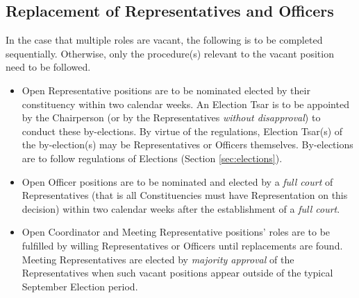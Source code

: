 \documentclass[8pt]{article}
\begin{document}
	\subsection{Replacement of Representatives and Officers}
	In the case that multiple roles are vacant, the following is to be completed sequentially. Otherwise, only the procedure(s) relevant to the vacant position need to be followed. 
	\begin{itemize}
		\item Open Representative positions are to be nominated elected by their constituency within two calendar weeks. An Election Tsar is to be appointed by the Chairperson (or by the Representatives \textit{without disapproval}) to conduct these by-elections. By virtue of the regulations, Election Tsar(s) of the by-election(s) may be Representatives or Officers themselves. By-elections are to follow regulations of Elections (Section \ref{sec:elections}).
		\item Open Officer positions are to be nominated and elected by a \textit{full court} of Representatives (that is all Constituencies must have Representation on this decision) within two calendar weeks after the establishment of a \textit{full court}.
		\item Open Coordinator and Meeting Representative positions' roles are to be fulfilled by willing Representatives or Officers until replacements are found. Meeting Representatives are elected by \textit{majority approval} of the Representatives when such vacant positions appear outside of the typical September Election period.
	\end{itemize}
\end{document}
